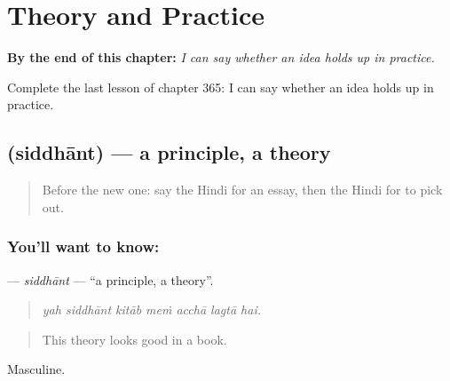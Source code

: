 
\chapter{Theory and Practice}
\label{ch:hi-theory-and-practice}

\begin{chapteropening}
\textbf{By the end of this chapter:} \emph{I can say whether an idea holds up in practice.}

Complete the last lesson of chapter 365: I can say whether an idea holds up in practice.
\end{chapteropening}

\section[\texorpdfstring{\hi{सिद्धांत} (siddhānt)}{सिद्धांत (siddhānt)}]{ (siddhānt) — a principle, a theory}

\label{lesson:HI-C365-siddhant}



\begin{quote}
Before the new one: say the Hindi for an essay, then the Hindi for to pick out.
\end{quote}

\subsection*{You'll want to know: }
\textbf{} — \emph{siddhānt} — \textquotedblleft{}a principle, a theory\textquotedblright{}.

\begin{quote}
      
\end{quote}

\begin{quote}
\emph{yah siddhānt kitāb meṁ acchā lagtā hai.}
\end{quote}

\begin{quote}
This theory looks good in a book.
\end{quote}

Masculine.

